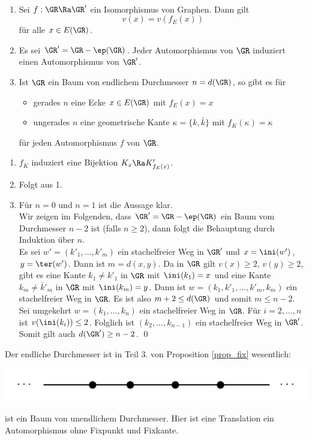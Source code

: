 \PROP\
\label{prop_fix}
\begin{enumerate}
\item Sei $f:\GR\Ra\GR'$ ein Isomorphismus von Graphen.
Dann gilt
\[
v(x) = v(f_E(x))
\]
für alle $x\in E(\GR)$.
\item Es sei $\GR'=\GR-\ep(\GR)$. Jeder Automorphismus von $\GR$
induziert einen Automorphismus von $\GR'$.
\item Ist $\GR$ ein Baum von endlichem Durchmesser $n=d(\GR)$,
so gibt es für
	\begin{itemize}
	\item gerades $n$ eine Ecke $x\in E(\GR)$ mit $f_E(x)=x$
	\item ungerades $n$ eine geometrische Kante $\kappa=\{k,\bar{k}\}$
	mit $f_K(\kappa)=\kappa$
	\end{itemize}
für jeden Automorphismus $f$ von $\GR$.
\end{enumerate}
\bew 
\begin{enumerate}
\item $f_K$ induziert eine Bijektion $K_x\Ra K'_{f_E(x)}$.
\item Folgt aus 1.
\item Für $n=0$ und $n=1$ ist die Aussage klar.\\
Wir zeigen im Folgenden, dass $\GR'=\GR-\ep(\GR)$ ein Baum vom
Durchmesser $n-2$ ist (falls $n\geq 2$), dann folgt die
Behauptung durch Induktion über $n$.\\
Es sei $w'=(k'_1,\ldots,k'_m)$ ein stachelfreier Weg in $\GR'$
und $x=\ini(w')$, $y=\ter(w')$. Dann ist $m=d(x,y)$.
Da in $\GR$ gilt $v(x)\geq 2$, $v(y)\geq 2$, gibt es eine Kante
$k_1\neq k'_1$ in $\GR$ mit $\ini(k_1)=x$ und eine Kante
$k_m\neq \bar{k}'_m$ in $\GR$ mit $\ini(k_m)=y$.
Dann ist $w=(k_1,k'_1,\ldots,k'_m,k_m)$ ein stachelfreier Weg
in $\GR$. Es ist also $m+2\leq d(\GR)$ und somit $m\leq n-2$.\\
Sei umgekehrt $w=(k_1,\ldots,k_n)$ ein stachelfreier Weg in $\GR$.
Für $i=2,\ldots,n$ ist $v(\ini(k_i))\leq 2$. Folglich ist
$(k_2,\ldots,k_{n-1})$ ein stachelfreier Weg in $\GR'$.
Somit gilt auch $d(\GR')\geq n-2$.
\qed
\end{enumerate}

\BSP Der endliche Durchmesser ist in Teil 3. von Proposition
\ref{prop_fix} wesentlich:
\begin{center}
	\includegraphics{grugraImages/unendldiam}
\end{center}
ist ein Baum von unendlichem Durchmesser. Hier ist eine Translation
ein Automorphismus ohne Fixpunkt und Fixkante.

